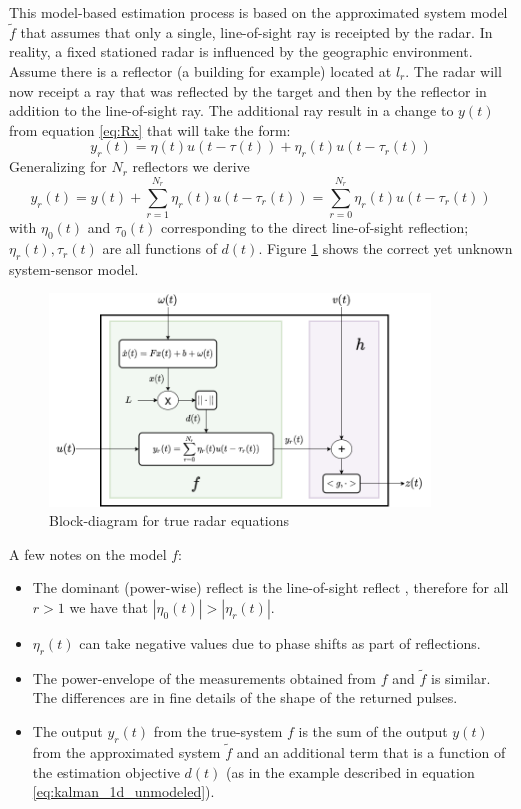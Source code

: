\documentclass[oneside,12pt]{article}
\newcommand{\abs}[1]{\left| #1\right| }                   %
\begin{document}
%
This model-based estimation process is based on the approximated system model $\tilde{f}$ that assumes that only a single, line-of-sight ray is receipted by the radar. In reality, a fixed stationed radar is influenced by the geographic environment. Assume there is a reflector (a building for example) located at $l_r$. The radar will now receipt a ray that was reflected by the target and then by the reflector in addition to the line-of-sight ray. The additional ray result in a change to $y(t)$ from equation \ref{eq:Rx} that will take the form:
%
\begin{equation}
    y_r(t) = \eta(t) u(t-\tau(t)) + \eta_r(t) u(t-\tau_r(t))
\end{equation}
%
Generalizing for $N_r$ reflectors we derive
%
\begin{equation}\label{eq:y_r}
    y_r(t) = y(t) + \sum_{r=1}^{N_r} \eta_r(t) u(t-\tau_r(t)) = \sum_{r=0}^{N_r} \eta_r(t) u(t-\tau_r(t))
\end{equation}
%
with $\eta_0(t)$ and $\tau_0(t)$ corresponding to the direct line-of-sight reflection; $\eta_r(t),\tau_r(t)$ are all functions of $d(t)$. Figure \ref{fig:Radar-True} shows the correct yet unknown system-sensor model.
%
\begin{figure}
    \centering
        \includegraphics[width=0.9\textwidth]{./Radar-True}
        \caption{\label{fig:Radar-True}Block-diagram for true radar equations}
\end{figure}
%
A few notes on the model ${f}$:
\begin{itemize}
    \item The dominant (power-wise) reflect is the line-of-sight reflect , therefore for all $r>1$ we have that $\abs{\eta_0(t)} > \abs{\eta_r(t)}$.
    \item $\eta_r(t)$ can take negative values due to phase shifts as part of reflections.
    \item The power-envelope of the measurements obtained from $f$ and $\tilde{f}$ is similar. The differences are in fine details of the shape of the returned pulses.
    \item The output $y_r(t)$ from the true-system $f$ is the sum of the output $y(t)$ from the approximated system $\tilde{f}$ and an additional term that is a function of the estimation objective $d(t)$ (as in the example described in equation \ref{eq:kalman_1d_unmodeled}).
\end{itemize}
%
\end{document}
